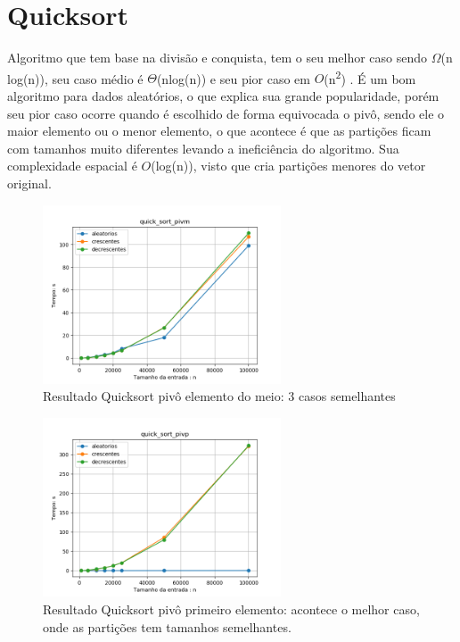 \documentclass[10pt,a4paper]{article}
\begin{document}
\section{Quicksort}
    \indent Algoritmo que tem base na divisão e conquista, tem o seu melhor caso sendo $\Omega$(n log(n)), seu caso médio é $\Theta$(nlog(n)) e seu pior caso em $O$(n\textsuperscript{2}) \cite{hoare}. É um bom algoritmo para dados aleatórios, o que explica sua grande popularidade, porém seu pior caso ocorre quando é escolhido de forma equivocada o pivô, sendo ele o maior elemento ou o menor elemento, o que acontece é que as partições ficam com tamanhos muito diferentes levando a ineficiência do algoritmo. Sua complexidade espacial é $O$(log(n)), visto que cria partições menores do vetor original.
    \begin{figure}[H]
    	\centering
    	\includegraphics[width=0.63\textwidth]{Resultados/Graficos/quick_sort_pivm.png}
    	\caption{Resultado Quicksort pivô elemento do meio: 3 casos semelhantes}
    \end{figure}
    \begin{figure}[H]
    	\centering
    	\includegraphics[width=0.63\textwidth]{Resultados/Graficos/quick_sort_pivp.png}
    	\caption{Resultado Quicksort pivô primeiro elemento: acontece o melhor caso, onde as partições tem tamanhos semelhantes.}
    \end{figure}
\end{document}
